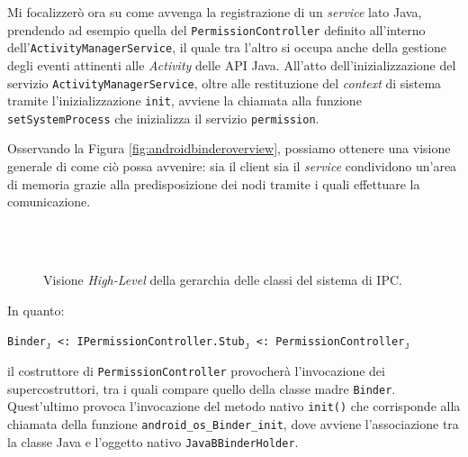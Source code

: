 Mi focalizzerò ora su come avvenga la registrazione di un \textit{service} lato Java,
prendendo ad esempio quella del \texttt{\small PermissionController} definito
all'interno dell'\texttt{\small ActivityManagerService}, il quale tra l'altro si 
occupa anche della gestione degli eventi attinenti alle \textit{Activity} delle
API Java. All'atto dell'inizializzazione del servizio \texttt{\small ActivityManagerService},
oltre alle restituzione del \textit{context} di sistema tramite l'inizializzazione
\texttt{\small init},  avviene la chiamata alla funzione \texttt{\small setSystemProcess}
che inizializza il servizio \texttt{\small permission}.

Osservando la  Figura \vref{fig:androidbinderoverview}, possiamo ottenere una
visione generale di come ciò possa avvenire: sia il client sia il \textit{service}
condividono un'area di memoria grazie alla predisposizione dei
nodi tramite i quali effettuare la comunicazione.


\begin{figure}[p]
\centering
{}\\
\\
\caption{Visione \textit{High-Level} della gerarchia delle classi del sistema di IPC.}
\label{fig:highlevelhierarchy}
\end{figure}

In quanto:
\begin{center}
\texttt{\small Binder$_\mathtt{J}$ <: IPermissionController.Stub$_\mathtt{J}$ <: PermissionController$_\mathtt{J}$}
\end{center}
il costruttore di \texttt{\small PermissionController} provocherà l'invocazione
dei supercostruttori, tra i quali compare quello della classe madre \texttt{\small Binder}.
Quest'ultimo provoca l'invocazione del metodo nativo \texttt{\small init()}
che corrisponde alla chiamata della funzione \texttt{\small android\_os\_Binder\_init},
dove avviene l'associazione tra la classe Java e l'oggetto nativo \texttt{\small JavaBBinderHolder}.

